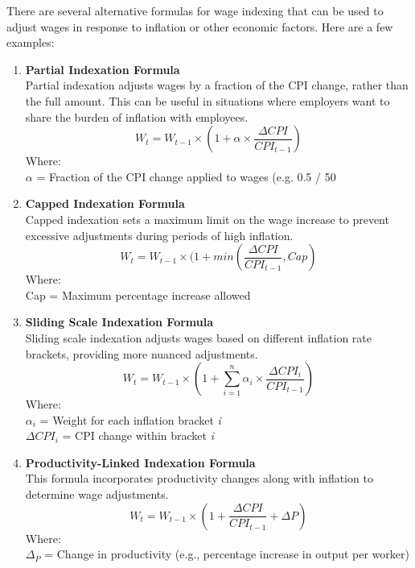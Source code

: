 \documentclass[14pt,a4paper]{article}
\begin{document}
There are several alternative formulas for wage indexing that can be used to adjust wages in response to inflation or other economic factors. Here are a few examples: \\
\begin{enumerate}
\item \textbf{Partial Indexation Formula} \\
Partial indexation adjusts wages by a fraction of the CPI change, rather than the full amount. This can be useful in situations where employers want to share the burden of inflation with employees. \\
\begin{equation}
 W_t = W_{t-1} \times \left(1 + \alpha \times \frac{\Delta CPI}{CPI_{t-1}}\right)
\end{equation}
Where: \\
$\alpha$ = Fraction of the CPI change applied to wages (e.g. 0.5 / 50%
\\
\item \textbf{Capped Indexation Formula}\\
Capped indexation sets a maximum limit on the wage increase to prevent excessive adjustments during periods of high inflation. \\
\begin{equation}
W_t = W_{t-1}\times(1+ min \left(\frac{\Delta CPI}{CPI_{t-1}}, Cap\right)
\end{equation}
Where: \\
Cap = Maximum percentage increase allowed \\
\item \textbf{Sliding Scale Indexation Formula} \\
Sliding scale indexation adjusts wages based on different inflation rate brackets, providing more nuanced adjustments.
\begin{equation}
W_t = W_{t-1} \times \left(1 + \sum_{i=1}^{n} \alpha_i \times \frac{\Delta CPI_i}{CPI_{t-1}}\right)
\end{equation}
Where: \\
 $\alpha_{i}$ = Weight for each inflation bracket \textit{i} \\
 $\Delta CPI_{i}$ = CPI change within bracket \textit{i} \\
\item \textbf{Productivity-Linked Indexation Formula}\\ 
This formula incorporates productivity changes along with inflation to determine wage adjustments.
\begin{equation}
W_t = W_{t-1} \times \left(1 + \frac{\Delta CPI}{CPI_{t-1}} + \Delta P\right)
\end{equation}
Where:\\
$\Delta_{P}$ = Change in productivity (e.g., percentage increase in output per worker)
\end{enumerate}
\end{document}
